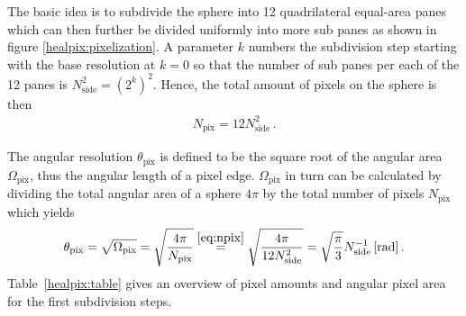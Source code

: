 The basic idea is to subdivide the sphere into 12 quadrilateral equal-area panes which can then further be divided uniformly into more sub panes as shown in figure \ref{healpix:pixelization}. A parameter $k$ numbers the subdivision step starting with the base resolution at $k=0$ so that the number of sub panes per each of the 12 panes is $N_{\text{side}}^2=\left(2^k\right)^2$. Hence, the total amount of pixels on the sphere is then \cite{healpix:paper}
\begin{align}
N_\text{pix} = 12N_\text{side}^2\,.
\label{eq:npix}
\end{align}

The angular resolution $\theta_\text{pix}$ is defined to be the square root of the angular area $\Omega_\text{pix}$, thus the angular length of a pixel edge. $\Omega_\text{pix}$ in turn can be calculated by dividing the total angular area of a sphere $4\pi$ by the total number of pixels $N_\text{pix}$ which yields \cite{healpix:paper}
\begin{align}
	\theta_\text{pix} = \sqrt{\Omega_\text{pix}} = \sqrt{\frac{4\pi}{N_\text{pix}}} \overset{\eqref{eq:npix}}{=} \sqrt{\frac{4\pi}{12N_\text{side}^2}} = \sqrt{\frac{\pi}{3}}N_\text{side}^{-1}\,[\si{\radian}]\,.
\end{align} 
Table~\ref{healpix:table} gives an overview of pixel amounts and angular pixel area for the first subdivision steps.\\

